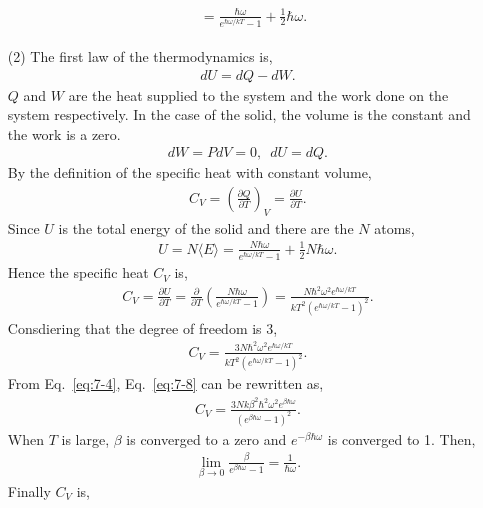 \documentclass[floatfix,nofootinbib,superscriptaddress,fleqn]{revtex4-2}
\begin{document}
\begin{itemize}
\begin{align}
\begin{split}
      &=\frac{\hbar\omega}{e^{\hbar\omega/kT}-1} 
      + \frac{1}{2}\hbar\omega.
    \end{split}
  \end{align}
  \item[(2)] The first law of the thermodynamics is,
  \begin{align}
    dU = dQ - dW.
  \end{align} 
  $Q$ and $W$ are the heat supplied to the system and 
  the work done on the system respectively. In the case of
  the solid, the volume is the constant and the work is a zero.
  \begin{align}
    dW = PdV = 0,\,\,\, dU = dQ.
  \end{align}
  By the definition of the specific heat with constant volume,
  \begin{align}
    C_V = \left(\frac{\partial Q}{\partial T}\right)_V 
    =\frac{\partial U}{\partial T}.
  \end{align}
  Since $U$ is the total energy of the solid and there are the $N$
  atoms,
  \begin{align}
    U = N\langle E\rangle=\frac{N\hbar\omega}{e^{\hbar\omega/kT}-1} 
    + \frac{1}{2}N\hbar\omega.
  \end{align}
  Hence the specific heat $C_V$ is,
  \begin{align}\label{eq:7-8}
    C_V = \frac{\partial U}{\partial T}
    = \frac{\partial }{\partial T}
    \left(\frac{N\hbar\omega}{e^{\hbar\omega/kT}-1}\right) 
    =\frac{N\hbar^2\omega^2e^{\hbar\omega/kT}}
    {kT^2\left(e^{\hbar\omega/kT}-1\right)^2}.
  \end{align}
  Consdiering that the degree of freedom is 3,
  \begin{align}
    C_V = \frac{3N\hbar^2\omega^2e^{\hbar\omega/kT}}
    {kT^2\left(e^{\hbar\omega/kT}-1\right)^2}.
  \end{align}
  From Eq.~\eqref{eq:7-4}, Eq.~\eqref{eq:7-8} can be rewritten as,
  \begin{align}
    C_V=\frac{3Nk\beta^2\hbar^2\omega^2e^{\beta\hbar\omega}}
    {\left(e^{\beta\hbar\omega}-1\right)^2}.
  \end{align}
  When $T$ is large, $\beta$ is converged to a zero and $e^{-\beta\hbar\omega}$
  is converged to 1. Then,
  \begin{align}
    \lim_{\beta\rightarrow 0}\frac{\beta}
    {e^{\beta\hbar\omega}-1} = \frac{1}{\hbar\omega}.
  \end{align}
  Finally $C_V$ is,
  \begin{align}

\end{align}
\end{itemize}
\end{document}
